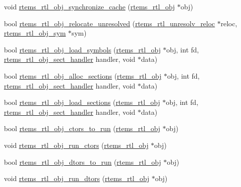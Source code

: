 \begin{DoxyCompactItemize}
\item 
void \mbox{\hyperlink{rtl-obj_8h_a98c2a1b1a67add778c0b4017976f91c3}{rtems\+\_\+rtl\+\_\+obj\+\_\+synchronize\+\_\+cache}} (\mbox{\hyperlink{structrtems__rtl__obj}{rtems\+\_\+rtl\+\_\+obj}} $\ast$obj)
\item 
bool \mbox{\hyperlink{rtl-obj_8h_ad6bfd56d63e3cf2562d48a39b7fffc24}{rtems\+\_\+rtl\+\_\+obj\+\_\+relocate\+\_\+unresolved}} (\mbox{\hyperlink{structrtems__rtl__unresolv__reloc}{rtems\+\_\+rtl\+\_\+unresolv\+\_\+reloc}} $\ast$reloc, \mbox{\hyperlink{structrtems__rtl__obj__sym}{rtems\+\_\+rtl\+\_\+obj\+\_\+sym}} $\ast$sym)
\item 
bool \mbox{\hyperlink{rtl-obj_8h_acdf565c078750f3114d8fd5ead341cdf}{rtems\+\_\+rtl\+\_\+obj\+\_\+load\+\_\+symbols}} (\mbox{\hyperlink{structrtems__rtl__obj}{rtems\+\_\+rtl\+\_\+obj}} $\ast$obj, int fd, \mbox{\hyperlink{rtl-obj_8h_a7af5827cf336da33eef4564a6e00ba11}{rtems\+\_\+rtl\+\_\+obj\+\_\+sect\+\_\+handler}} handler, void $\ast$data)
\item 
bool \mbox{\hyperlink{rtl-obj_8h_abfecc46708adb154ec1a87f1fcc97662}{rtems\+\_\+rtl\+\_\+obj\+\_\+alloc\+\_\+sections}} (\mbox{\hyperlink{structrtems__rtl__obj}{rtems\+\_\+rtl\+\_\+obj}} $\ast$obj, int fd, \mbox{\hyperlink{rtl-obj_8h_a7af5827cf336da33eef4564a6e00ba11}{rtems\+\_\+rtl\+\_\+obj\+\_\+sect\+\_\+handler}} handler, void $\ast$data)
\item 
bool \mbox{\hyperlink{rtl-obj_8h_aac7c6817d06d317f301538bcf30ffa9f}{rtems\+\_\+rtl\+\_\+obj\+\_\+load\+\_\+sections}} (\mbox{\hyperlink{structrtems__rtl__obj}{rtems\+\_\+rtl\+\_\+obj}} $\ast$obj, int fd, \mbox{\hyperlink{rtl-obj_8h_a7af5827cf336da33eef4564a6e00ba11}{rtems\+\_\+rtl\+\_\+obj\+\_\+sect\+\_\+handler}} handler, void $\ast$data)
\item 
bool \mbox{\hyperlink{rtl-obj_8h_a1d4c73beba22bae24a66704baa5a8e5a}{rtems\+\_\+rtl\+\_\+obj\+\_\+ctors\+\_\+to\+\_\+run}} (\mbox{\hyperlink{structrtems__rtl__obj}{rtems\+\_\+rtl\+\_\+obj}} $\ast$obj)
\item 
void \mbox{\hyperlink{rtl-obj_8h_ab61d5e574b2e115b9fa004bdd2619f23}{rtems\+\_\+rtl\+\_\+obj\+\_\+run\+\_\+ctors}} (\mbox{\hyperlink{structrtems__rtl__obj}{rtems\+\_\+rtl\+\_\+obj}} $\ast$obj)
\item 
bool \mbox{\hyperlink{rtl-obj_8h_ae2f95f4733d04acbb018f431340be2db}{rtems\+\_\+rtl\+\_\+obj\+\_\+dtors\+\_\+to\+\_\+run}} (\mbox{\hyperlink{structrtems__rtl__obj}{rtems\+\_\+rtl\+\_\+obj}} $\ast$obj)
\item 
void \mbox{\hyperlink{rtl-obj_8h_a4c2ee2202085fecf74954e175a0fb7e3}{rtems\+\_\+rtl\+\_\+obj\+\_\+run\+\_\+dtors}} (\mbox{\hyperlink{structrtems__rtl__obj}{rtems\+\_\+rtl\+\_\+obj}} $\ast$obj)

\end{DoxyCompactItemize}
